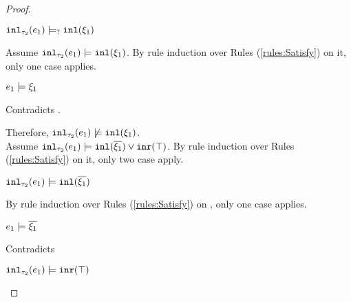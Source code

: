 \begin{proof}
\begin{byCases}
\begin{byCases}
\begin{byCases}
\begin{pfsteps*}
            \item $\mathtt{inl}_{\tau_2}({e_1}) \models_{?} \mathtt{inl}(\xi_1)$ 
            \end{pfsteps*}
            Assume $\mathtt{inl}_{\tau_2}({e_1}) \models \mathtt{inl}(\xi_1)$. By rule induction over Rules (\ref{rules:Satisfy}) on it, only one case applies.
            \begin{byCases}
            \item[\text{(\ref{rule:CSInl})}]
                \begin{pfsteps*}
                \item $e_1 \models \xi_1$
                \end{pfsteps*}
                Contradicts .
            \end{byCases}
            Therefore, $\mathtt{inl}_{\tau_2}({e_1}) \not\models \mathtt{inl}(\xi_1)$.\\
            Assume $\mathtt{inl}_{\tau_2}({e_1}) \models \mathtt{inl}(\overline{\xi_1}) \vee \mathtt{inr}(\top)$. By rule induction over Rules (\ref{rules:Satisfy}) on it, only two case apply.
            \begin{byCases}
            \item[\text{(\ref{rule:CSOr1})}]
                \begin{pfsteps*}
                \item $\mathtt{inl}_{\tau_2}({e_1}) \models \mathtt{inl}(\overline{\xi_1})$  
                \end{pfsteps*}
                By rule induction over Rules (\ref{rules:Satisfy}) on , only one case applies.
                \begin{byCases}
                \item[\text{(\ref{rule:CSInl})}]
                    \begin{pfsteps*}
                    \item $e_1 \models \overline{\xi_1}$ 
                    \end{pfsteps*}
                    Contradicts 
                \end{byCases}
            \item[\text{(\ref{rule:CSOr2})}]
                \begin{pfsteps*}
                \item $\mathtt{inl}_{\tau_2}({e_1}) \models \mathtt{inr}(\top)$  

\end{pfsteps*}
\end{byCases}
\end{byCases}
\end{byCases}
\end{byCases}
\end{proof}
